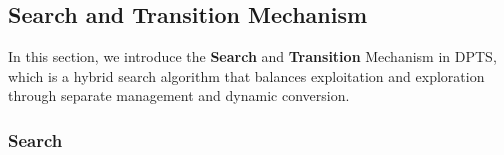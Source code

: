 
\subsection{Search and Transition Mechanism}
\label{sec:search_and_transition}
In this section, we introduce the \textbf{Search} and \textbf{Transition} Mechanism in DPTS, which is a hybrid search algorithm that balances exploitation and exploration through separate management and dynamic conversion. 

\subsubsection{Search}
\label{sec:method_searching}




